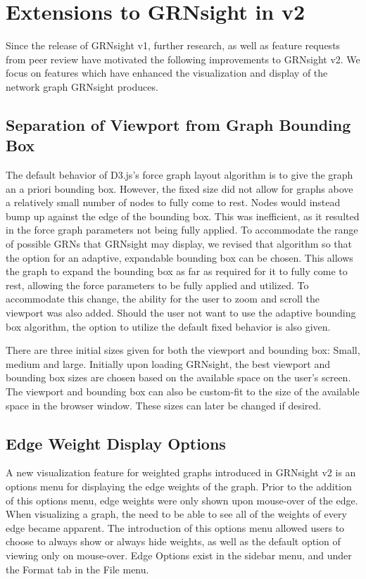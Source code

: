 \documentclass[sigconf,review]{acmart}
\begin{document}
\section{Extensions to GRNsight in v2}
Since the release of GRNsight v1, further research, as well as feature requests from peer review have motivated the following improvements to GRNsight v2. We focus on features which have enhanced the visualization and display of the network graph GRNsight produces.

\subsection{Separation of Viewport from Graph Bounding Box}
The default behavior of D3.js's force graph layout algorithm is to give the graph an a priori bounding box. However, the fixed size did not allow for graphs above a relatively small number of nodes to fully come to rest. Nodes would instead bump up against the edge of the bounding box. This was inefficient, as it resulted in the force graph parameters not being fully applied. To accommodate the range of possible GRNs that GRNsight may display, we revised that algorithm so that the option for an adaptive, expandable bounding box can be chosen. This allows the graph to expand the bounding box as far as required for it to fully come to rest, allowing the force parameters to be fully applied and utilized. To accommodate this change, the ability for the user to zoom and scroll the viewport was also added. Should the user not want to use the adaptive bounding box algorithm, the option to utilize the default fixed behavior is also given. 

There are three initial sizes given for both the viewport and bounding box: Small, medium and large. Initially upon loading GRNsight, the best viewport and bounding box sizes are chosen based on the available space on the user's screen. The viewport and bounding box can also be custom-fit to the size of the available space in the browser window. These sizes can later be changed if desired. 

\subsection{Edge Weight Display Options}
A new visualization feature for weighted graphs introduced in GRNsight v2 is an options menu for displaying the edge weights of the graph. Prior to the addition of this options menu, edge weights were only shown upon mouse-over of the edge. When visualizing a graph, the need to be able to see all of the weights of every edge became apparent. The introduction of this options menu allowed users to choose to always show or always hide weights, as well as the default option of viewing only on mouse-over. Edge Options exist in the sidebar menu, and under the Format tab in the File menu.
\end{document}
